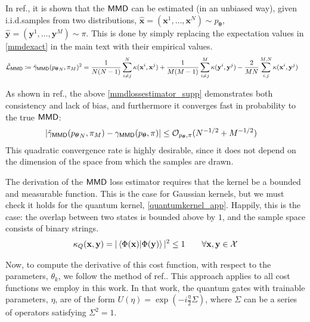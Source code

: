 In ref., it is shown that the $\operatorname{\textsf{MMD}}$ can be estimated (in an unbiased way), given i.i.d.\@ samples from two distributions, $\hat{\mathbf{x}} = (\mathbf{x}^1,\dots, \mathbf{x}^N) \sim p_{\boldsymbol\theta}$, $\hat{\mathbf{y}} = (\mathbf{y}^1, \dots, \mathbf{y}^M) \sim \pi$.
This is done by simply replacing the expectation values in \eqref{mmdexact} in the main text with their empirical values.
\begin{align}
      \tilde{\mathcal{L}}_{\operatorname{\textsf{MMD}}} &  \coloneqq \tilde{\gamma}_{\operatorname{\textsf{MMD}}}({p_{\boldsymbol\theta}}_N, {\pi}_M)^2 =\frac{1}{N(N-1)}\sum\limits_{i \neq j}^N \kappa(\mathbf{x}^i, \mathbf{x}^j) + \frac{1}{M(M-1)}\sum\limits_{i \neq j}^M \kappa(\mathbf{y}^i, \mathbf{y}^j) -\frac{2}{MN}\sum\limits_{i ,j}^{M, N} \kappa(\mathbf{x}^i, \mathbf{y}^j)   \label{mmdlossestimator_supp}
\end{align}

As shown in ref., the above \eqref{mmdlossestimator_supp} demonstrates both consistency and lack of bias, and furthermore it converges fast in probability to the true $\operatorname{\textsf{MMD}}$:
\begin{align}
|\tilde{\gamma}_{\operatorname{\textsf{MMD}}}({p_{\boldsymbol\theta}}_N, \pi_M)  &-\gamma_{\operatorname{\textsf{MMD}}}(p_{\boldsymbol\theta}, \pi)| \leq \mathcal{O}_{p_{\boldsymbol\theta}, \pi}(N^{-1/2} + M^{-1/2})\label{mmdsamplecomplexity}
\end{align} 
This quadratic convergence rate is highly desirable, since it does not depend on the dimension of the space from which the samples are drawn. 

The derivation of the $\operatorname{\textsf{MMD}}$ loss estimator requires that the kernel be a bounded and measurable function. This is the case for Gaussian kernels, but we must check it holds for the quantum kernel, \eqref{quantumkernel_app}. Happily, this is the case: the overlap between two states is bounded above by $1$, and the sample space consists of binary strings.
\begin{align}
    \kappa_Q(\mathbf{x}, \mathbf{y}) = |\braket{\Phi(\mathbf{x})|\Phi(\mathbf{y})}|^2 \leq 1 \qquad \forall \mathbf{x}, \mathbf{y} \in \mathcal{X}
\end{align}

Now, to compute the derivative of this cost function, with respect to the parameters, $\theta_k$, we follow the method of ref.. This approach applies to all cost functions we employ in this work. In that work, the quantum gates with trainable parameters, $\eta$, are of the form $U(\eta) = \exp(-i\frac{\eta}{2}\Sigma)$, where $\Sigma$ can be a series of operators satisfying $\Sigma^2 = 1$.

